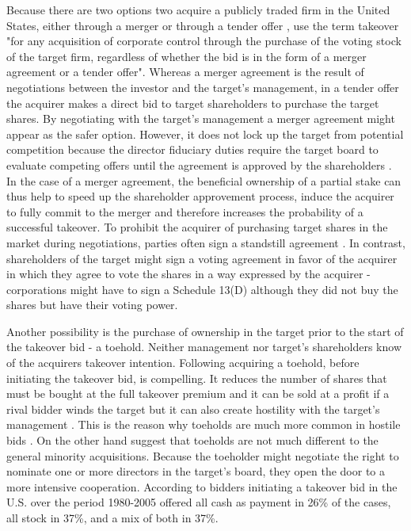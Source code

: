 \documentclass[12pt]{article}
\begin{document}
Because there are two options two acquire a publicly traded firm in the United States, either through a merger or through a tender offer \citep{Offenberg2015}, \citet[p.1]{Mitchell2011} use the term takeover "for any acquisition of corporate control through the purchase of the voting stock of the target firm, regardless of whether the bid is in the form of a merger agreement or a tender offer". Whereas a merger agreement is the result of negotiations between the investor and the target's management, in a tender offer the acquirer makes a direct bid to target shareholders to purchase the target shares.
By negotiating with the target's management a merger agreement might appear as the safer option. However, it does not lock up the target from potential competition because the director fiduciary duties require the target board to evaluate competing offers until the agreement is approved by the shareholders \citep{Mitchell2011}. In the case of a merger agreement, the beneficial ownership of a partial stake can thus help to speed up the shareholder approvement process, induce the acquirer to fully commit to the merger and therefore increases the probability of a successful takeover. To prohibit the acquirer of purchasing target shares in the market during negotiations, parties often sign a standstill agreement \citep{Mitchell2011}. In contrast, shareholders of the target might sign a voting agreement in favor of the acquirer in which they agree to vote the shares in a way expressed by the acquirer - corporations might have to sign a Schedule 13(D) although they did not buy the shares but have their voting power. 

Another possibility is the purchase of ownership in the target prior to the start of the takeover bid - a toehold. Neither management nor target's shareholders know of the acquirers takeover intention. Following \citet[p.158]{Eckbo2009} acquiring a toehold, before initiating the takeover bid, is compelling. It reduces the number of shares that must be bought at the full takeover premium and it can be sold at a profit if a rival bidder winds the target but it can also create hostility with the target's management \citep{Goldman2005}. This is the reason why toeholds are much more common in hostile bids \citep{Mitchell2011}. On the other hand \citet[p. 216]{Povel2014} suggest that toeholds are not much different to the general minority acquisitions. Because the toeholder might negotiate the right to nominate one or more directors in the target's board, they open the door to a more intensive cooperation. According to \citep{Mitchell2011} bidders initiating a takeover bid in the U.S. over the period 1980-2005 offered all cash as payment in 26\% of the cases, all stock in 37\%, and a mix of both in 37\%.
\end{document}
